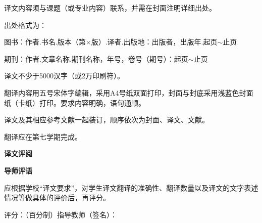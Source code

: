 \documentclass[11pt,a4paper]{article}
\newcommand{\hwzs}{\CJKfamily{hwzs}}
\newcommand{\sanhao}{\fontsize{16pt}{22pt}\selectfont}
\newcommand{\sihao}{\fontsize{14pt}{18pt}\selectfont}
\newcommand{\wuhao}{\fontsize{10.5pt}{18pt}\selectfont}
\begin{document}
\vspace{-0.25cm}
{\sihao
\fontsize{14pt}{0.7cm}\selectfont

\begin{list}{}{
  \setlength{\leftmargin}{1.1cm}
  \setlength{\labelwidth}{1.1cm}
  \setlength{\labelsep}{0pt}
  \setlength{\itemindent}{0pt}
  \setlength{\listparindent}{0pt}
  \setlength{\parsep}{0pt}
  \setlength{\itemsep}{0pt}
  \setlength{\topsep}{0pt}
  \renewcommand{\makelabel}[1]{\hfill #1}
}

\item[一、] 译文内容须与课题（或专业内容）联系，并需在封面注明详细出处。
\item[二、] 出处格式为：
\item[] 图书：作者.书名.版本（第$\times$版）.译者.出版地：出版者，出版年.起页$\sim$止页
\item[] 期刊：作者.文章名称.期刊名称，年号，卷号（期号）：起页$\sim$止页
\item[三、] 译文不少于5000汉字（或2万印刷符）。
\item[四、] 翻译内容用五号宋体字编辑，采用A4号纸双面打印，封面与封底采用浅蓝色封面纸（卡纸）打印。要求内容明确，语句通顺。
\item[五、] 译文及其相应参考文献一起装订，顺序依次为封面、译文、文献。
\item[六、] 翻译应在第七学期完成。

\end{list}
}

\vspace{-5.25mm}

\begingroup
\setlength{\parskip}{0pt}
\setlength{\baselineskip}{25pt}
{\centering
    {\sanhao\hwzs\bfseries \fontsize{16pt}{25pt}\selectfont 译文评阅\par}
}
\vspace{2mm}
\nointerlineskip
\noindent\makebox[\textwidth]{\rule{\textwidth}{0.5pt}}\par
{\sihao\bfseries 导师评语\par}
\endgroup

{\sihao
\fontsize{14pt}{0.7cm}\selectfont
\setlength{\parindent}{0pt}
应根据学校“译文要求”，对学生译文翻译的准确性、翻译数量以及译文的文字表述情况等做具体的评价后，再评分。
}

\vspace{4.6cm}

{\wuhao
评分：\underline{\hspace{2cm}}（百分制）\hfill 指导教师（签名）：\underline{\hspace{3cm}}
}
\end{document}
